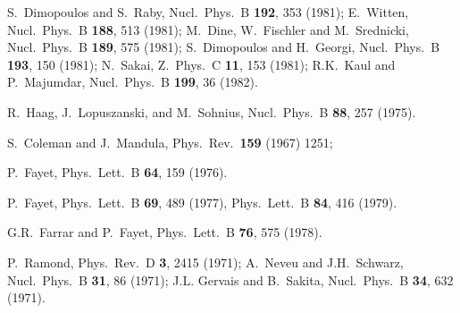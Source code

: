 \documentclass[12pt]{article}
\begin{document}
\begin{thebibliography}{999}
S.~Dimopoulos and S.~Raby,
  Nucl.\ Phys.\ B {\bf 192}, 353 (1981);
E.~Witten, 
  Nucl.\ Phys.\ B {\bf 188}, 513 (1981);
M.~Dine, W.~Fischler and M.~Srednicki,
  Nucl.\ Phys.\ B {\bf 189}, 575 (1981);
S.~Dimopoulos and H.~Georgi, 
  Nucl.\ Phys.\ B {\bf 193}, 150 (1981);
N.~Sakai, 
  Z.\ Phys.\ C {\bf 11}, 153 (1981);
R.K.~Kaul and P.~Majumdar, 
  Nucl.\ Phys.\ B {\bf 199}, 36 (1982).

R.~Haag, J.~Lopuszanski, and M.~Sohnius,
  Nucl.\ Phys.\ B {\bf 88}, 257 (1975).

S.~Coleman and J.~Mandula, 
  Phys.\ Rev.\  {\bf 159} (1967) 1251;

P.~Fayet,
  Phys.\ Lett.\ B {\bf 64}, 159 (1976).

P.~Fayet,
  Phys.\ Lett.\ B {\bf 69}, 489 (1977),
  Phys.\ Lett.\ B {\bf 84}, 416 (1979).

G.R.~Farrar and P.~Fayet,
  Phys.\ Lett.\ B {\bf 76}, 575 (1978).

P.~Ramond, 
  Phys.\ Rev.\ D {\bf 3}, 2415 (1971);
A.~Neveu and J.H.~Schwarz, 
  Nucl.\ Phys.\ B {\bf 31}, 86 (1971);
J.L. Gervais and B.~Sakita, 
  Nucl.\ Phys.\ B {\bf 34}, 632 (1971).


\end{thebibliography}
\end{document}
